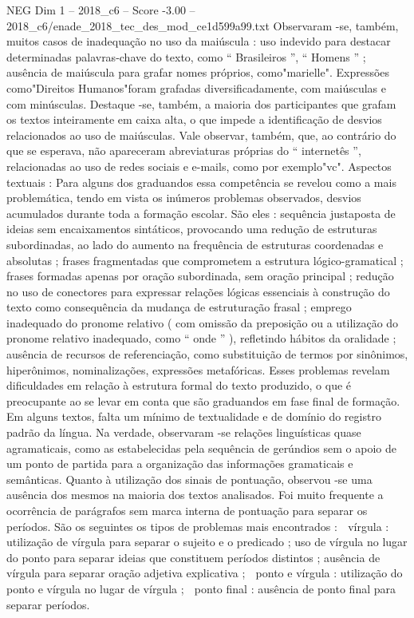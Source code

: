 \begin{textsample}{NEG Dim 1 – 2018\_c6 – Score -3.00 – 2018\_c6/enade\_2018\_tec\_des\_mod\_ce1d599a99.txt}
Observaram -se, também, muitos casos de inadequação no uso da maiúscula : uso indevido para destacar determinadas palavras-chave do texto, como “ Brasileiros ”, “ Homens ” ; ausência de maiúscula para grafar nomes próprios, como"marielle".
Expressões como"Direitos Humanos"foram grafadas diversificadamente, com maiúsculas e com minúsculas.
Destaque -se, também, a maioria dos participantes que grafam os textos inteiramente em caixa alta, o que impede a identificação de desvios relacionados ao uso de maiúsculas.
Vale observar, também, que, ao contrário do que se esperava, não apareceram abreviaturas próprias do “ internetês ”, relacionadas ao uso de redes sociais e e-mails, como por exemplo"vc".
Aspectos textuais : Para alguns dos graduandos essa competência se revelou como a mais problemática, tendo em vista os inúmeros problemas observados, desvios acumulados durante toda a formação escolar.
São eles : sequência justaposta de ideias sem encaixamentos sintáticos, provocando uma redução de estruturas subordinadas, ao lado do aumento na frequência de estruturas coordenadas e absolutas ; frases fragmentadas que comprometem a estrutura lógico-gramatical ; frases formadas apenas por oração subordinada, sem oração principal ; redução no uso de conectores para expressar relações lógicas essenciais à construção do texto como consequência da mudança de estruturação frasal ; emprego inadequado do pronome relativo ( com omissão da preposição ou a utilização do pronome relativo inadequado, como “ onde ” ), refletindo hábitos da oralidade ; ausência de recursos de referenciação, como substituição de termos por sinônimos, hiperônimos, nominalizações, expressões metafóricas.
Esses problemas revelam dificuldades em relação à estrutura formal do texto produzido, o que é preocupante ao se levar em conta que são graduandos em fase final de formação.
Em alguns textos, falta um mínimo de textualidade e de domínio do registro padrão da língua.
Na verdade, observaram -se relações linguísticas quase agramaticais, como as estabelecidas pela sequência de gerúndios sem o apoio de um ponto de partida para a organização das informações gramaticais e semânticas.
Quanto à utilização dos sinais de pontuação, observou -se uma ausência dos mesmos na maioria dos textos analisados.
Foi muito frequente a ocorrência de parágrafos sem marca interna de pontuação para separar os períodos.
São os seguintes os tipos de problemas mais encontrados :  vírgula : utilização de vírgula para separar o sujeito e o predicado ; uso de vírgula no lugar do ponto para separar ideias que constituem períodos distintos ; ausência de vírgula para separar oração adjetiva explicativa ;  ponto e vírgula : utilização do ponto e vírgula no lugar de vírgula ;  ponto final : ausência de ponto final para separar períodos.

\end{textsample}
